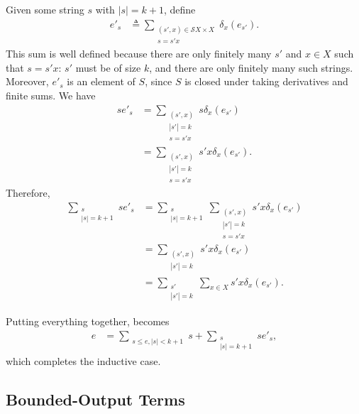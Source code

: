 \documentclass[11pt,a4paper]{amsart}
\theoremstyle{definition}
\begin{document}
\begin{proofEnd}
  Given some string $s$ with $|s| = k+1$, define
  \begin{align*}
    e'_s
    &  \triangleq 
       \sum _{\substack{(s', x)  \in  \mathcal{S}X  \times  X \\ s = s'x}}  \delta _x(e_{s'}).
  \end{align*}
  This sum is well defined because there are only finitely many $s'$ and $x  \in  X$
  such that $s = s'x$: $s'$ must be of size $k$, and there are only finitely
  many such strings.  Moreover, $e'_s$ is an element of $S$, since $S$ is closed
  under taking derivatives and finite sums. We have
  \begin{align*}
    se'_s
    & =  \sum _{\substack{(s',x) \\ |s'| = k \\ s = s'x}} s \delta _x(e_{s'}) \\
    & =  \sum _{\substack{(s',x) \\ |s'| = k \\ s = s'x}} s'x \delta _x(e_{s'}).
  \end{align*}
  Therefore,
  \begin{align*}
     \sum _{\substack{s \\ |s|=k+1}} se'_s
    & =  \sum _{\substack{s \\ |s|=k+1}} \sum _{\substack{(s',x) \\ |s'| = k\\ s = s'x}} s'x \delta _x(e_{s'}) \\
    & =  \sum _{\substack{(s',x) \\ |s'| = k}} s'x \delta _x(e_{s'}) \\
    & =  \sum _{\substack{s' \\ |s'| = k}} \sum _{x  \in  X} s'x \delta _x(e_{s'}).
  \end{align*}

  Putting everything together,  becomes
  \begin{align}
    e & =  \sum _{\substack{s  \leq  e, |s| < k+1}} s +  \sum _{\substack{s \\ |s|=k+1}}se'_s
    \label{eq:expansion-3},
  \end{align}
  which completes the inductive case.
\end{proofEnd}

\subsection{Bounded-Output Terms}
\label{sec:bounded-output}
\end{document}
